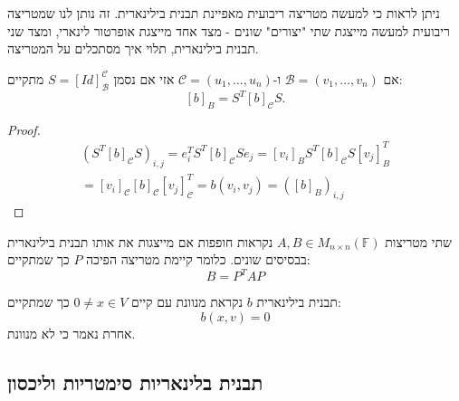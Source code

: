 \documentclass{tstextbook}
\begin{document}
\begin{remark}
ניתן לראות כי למעשה מטריצה ריבועית מאפיינת תבנית בילינארית. זה נותן לנו שמטריצה ריבועית למעשה מייצגת שתי "יצורים" שונים - מצד אחד מייצגת אופרטור לינארי, ומצד שני תבנית בילינארית, תלוי איך מסתכלים על המטריצה.

\end{remark}
\begin{proposition}
אם \(\mathcal{B}=\left( v_{1},\dots,v_{n} \right)\) ו-\(\mathcal{C}=\left( u_{1},\dots,u_{n} \right)\) אזי אם נסמן \(S=[Id]_{\mathcal{B}}^{\mathcal{C}}\) מתקיים:
$$[b]_{B}=S^{T}[b]_{\mathcal{C}}S.$$

\end{proposition}
\begin{proof}
$$\begin{gather}{{\left(S^{T}[b]_{\mathcal{C}}S\right)_{i,j}=e_{i}^{T}S^{T}[b]_{\mathcal{C}}S e_{j}}} {{=[v_{i}]_{B}S^{T}[b]_{\mathcal{C}}S[v_{j}]_{B}^{T}}}\\ {{=[v_{i}]_{\mathcal{C}}[b]_{\mathcal{C}}[v_{j}]_{\mathcal{C}}^{T}}} {{=b(v_{i},v_{j})=([b]_{B})_{i,j}}}\end{gather}$$

\end{proof}
\begin{definition}
שתי מטריצות \(A, B \in M_{n\times n}\left( \mathbb{F}  \right)\) נקראות חופפות אם מייצגות את אותו תבנית בילינארית בבסיסים שונים. כלומר קיימת מטריצה הפיכה \(P\) כך שמתקיים:
$$B=P^{T}AP$$

\end{definition}
\begin{definition}
תבנית בילינארית \(b\) נקראת מנוונת עם קיים \(0\neq x \in V\) כך שמתקיים:
$$b(x,v)=0$$
אחרת נאמר כי לא מנוונת.

\end{definition}
\subsection{תבנית בלינאריות סימטריות וליכסון}
\end{document}
